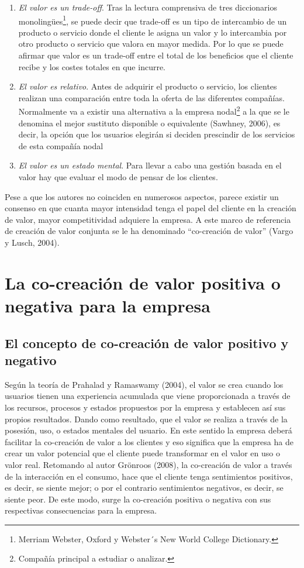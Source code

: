 \begin{enumerate}
\begin{itemize}
		\end{itemize}
	\item \emph{El valor es un trade-off}. Tras la lectura comprensiva de tres diccionarios monolingües\footnote{Merriam Webster, Oxford y Webster´s New World College Dictionary.}, se puede decir que trade-off es un tipo de intercambio de un producto o servicio donde el cliente le asigna un valor y lo intercambia por otro producto o servicio que valora en mayor medida. Por lo que se puede afirmar que valor es un trade-off entre el total de los beneficios que el cliente recibe y los costes totales en que incurre.
	\item \emph{El valor es relativo}. Antes de adquirir el producto o servicio, los clientes realizan una comparación entre toda la oferta de las diferentes compañías. Normalmente va a existir una alternativa a la empresa nodal\footnote{Compañía principal a estudiar o analizar.} a la que se le denomina el mejor sustituto disponible o equivalente (Sawhney, 2006), es decir, la opción que los usuarios elegirán si deciden prescindir de los servicios de esta compañía nodal
	\item \emph{El valor es un estado mental}. Para llevar a cabo una gestión basada en el valor hay que evaluar el modo de pensar de los clientes.

\end{enumerate}

Pese a que los autores no coinciden en numerosos aspectos, parece existir un consenso en que cuanta mayor intensidad tenga el papel del cliente en la creación de valor, mayor competitividad adquiere la empresa. A este marco de referencia de creación de valor conjunta se le ha denominado “co-creación de valor” (Vargo y Lusch, 2004).


\chapter{La co-creación de valor positiva o negativa para la empresa}
\label{anexo:2}

\section{El concepto de co-creación de valor positivo y negativo}

Según la teoría de Prahalad y Ramaswamy (2004), el valor se crea cuando los usuarios tienen una experiencia acumulada que viene proporcionada a través de los recursos, procesos y estados propuestos por la empresa y establecen así sus propios resultados. Dando como resultado, que el valor se realiza a través de la posesión, uso, o estados mentales del usuario. En este sentido la empresa deberá facilitar la co-creación de valor a los clientes y eso significa que la empresa ha de crear un valor potencial que el cliente puede transformar en el valor en uso o valor real. Retomando al autor Grönroos (2008), la co-creación de valor a través de la interacción en el consumo, hace que el cliente tenga sentimientos positivos, es decir, se siente mejor; o por el contrario sentimientos negativos, es decir, se siente peor. De este modo, surge la co-creación positiva o negativa con sus respectivas consecuencias para la empresa.

